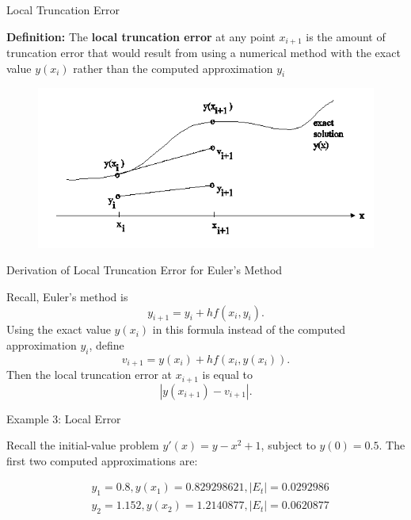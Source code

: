 \documentclass[12pt]{beamer}
\begin{document}
\begin{frame}{Local Truncation Error}

{\bf Definition:} The {\bf local truncation error} at any point $x_{i+1}$ is the amount of truncation error that would result from using a numerical method with the exact value $y(x_i)$ rather than the computed approximation $y_i$

\begin{figure}[h] 
  \centering
  \includegraphics[scale=0.65]{local_trunc}
  \label{fig:local_trunc}
\end{figure}

\end{frame}

\begin{frame}{Derivation of Local Truncation Error for Euler's Method}

Recall, Euler’s method is
\[
y_{i+1}=y_i+hf(x_i,y_i).
\]
Using the exact value $y(x_i)$ in this formula instead of the computed approximation $y_i$, define
\begin{equation}
v_{i+1}=y(x_i)+hf(x_i,y(x_i)).
\end{equation}
Then the local truncation error at $x_{i+1}$ is equal to
\[
|y(x_{i+1})-v_{i+1}|.
\]

\end{frame}

\begin{frame}{Example 3: Local Error}

Recall the initial-value problem $y'(x)=y-x^2+1$, subject to $y(0)=0.5$. The first two computed approximations are:

\begin{align*}
&y_1=0.8, y(x_1)=0.829298621, |E_t|=0.0292986 \\
&y_2=1.152, y(x_2)=1.2140877, |E_t|=0.0620877
\end{align*}

\vspace{2 in}

\end{frame}
\end{document}
